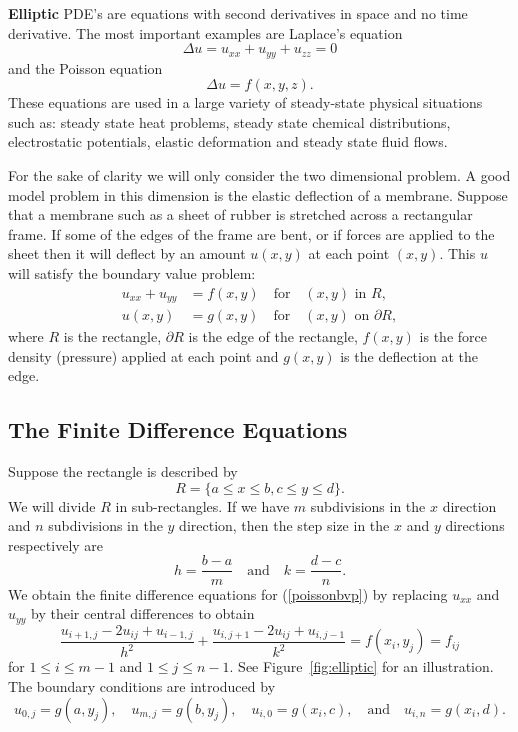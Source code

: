 {\bf Elliptic} PDE's are equations with second derivatives in space and
no time derivative. The most important examples are Laplace's
equation
$$ \Delta u = u_{xx} + u_{yy} + u_{zz} = 0 $$
and the Poisson equation
$$ \Delta u = f(x,y,z).  $$
These equations are used in a large variety of steady-state physical situations
such as: steady state heat problems, steady state chemical
distributions, electrostatic potentials, elastic deformation and
steady state fluid flows.

For the sake of clarity we will only consider the two dimensional
problem. A good model problem in this dimension is the elastic
deflection of a membrane. Suppose that a  membrane such as
a sheet of rubber is stretched across a rectangular frame.
If some of the edges of the frame are bent, or if forces are applied to
the sheet then it will deflect by an amount $u(x,y)$ at each
point $(x,y)$. This $u$ will satisfy the boundary value problem:
\begin{equation}\label{poissonbvp}
\begin{split}
u_{xx} + u_{yy} &= f(x,y) \quad\text{for}\quad (x,y) \text{ in } R, \\
u(x,y) &= g(x,y) \quad\text{for}\quad (x,y) \text{ on }  \partial R,
\end{split}
\end{equation}
where $R$ is the rectangle, $\partial R$ is the edge of the rectangle,
$f(x,y)$ is the force density (pressure) applied at each point and
$g(x,y)$ is the deflection at the edge.


\subsection*{The Finite Difference Equations}

Suppose the rectangle is described by
$$
 R = \{ a\le x \le b, c \le y \le d\}.
$$
We will divide $R$ in sub-rectangles. If we have $m$ subdivisions
in the $x$ direction and $n$ subdivisions in the $y$ direction,
then the step size in the $x$ and $y$ directions respectively are
$$
    h = \frac{b-a}{m} \quad \text{and} \quad k = \frac{d-c}{n}.
$$
We obtain the finite difference equations for (\ref{poissonbvp})
by replacing $u_{xx}$ and $u_{yy}$ by their central differences
to obtain
\begin{equation}\label{poissonfd}
  \frac{u_{i+1,j} - 2u_{ij} + u_{i-1,j}}{h^2}
    +    \frac{u_{i,j+1} - 2u_{ij} + u_{i,j-1}}{k^2}
       = f(x_i,y_j) = f_{ij}
\end{equation}
for $1 \le i \le m-1$ and $1 \le j \le n-1$.
See Figure~\ref{fig:elliptic} for an illustration.
The boundary conditions are introduced by
\begin{equation}\label{poissonbv}
    u_{0,j} = g(a,y_j), \quad u_{m,j} = g(b,y_j), \quad
        u_{i,0} = g(x_i,c), \quad\text{and}\quad u_{i,n} = g(x_i,d).
\end{equation}

